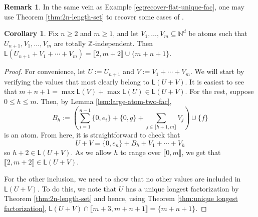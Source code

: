\documentclass{report}
\newcommand{\NN}{\mathbb{N}}
\newcommand{\ZZ}{\mathbb{Z}}
\newcommand{\llb}{\llbracket}
\newcommand{\rrb}{\rrbracket}
\renewcommand{\:}{\text{:}}
\theoremstyle{definition}
\newtheorem{cor}[defn]{Corollary}
\newtheorem{rk}[defn]{Remark}
\begin{document}
\begin{rk}
In the same vein as Example \ref{eg:recover-flat-unique-fac}, one may use Theorem \ref{thm:2n-length-set} to recover some cases of \cite[Proposition 4.8]{fan-tringali18}.
\end{rk}


\begin{cor} \label{thm:int-point-construction}
Fix $n\ge 2$ and $m\ge 1$, and let $V_1,\dots, V_m \subseteq \NN^d$ be atoms such that $U_{n+1},V_1,\dots, V_m$ are totally $\ZZ$-independent.
Then $\mathsf{L}(U_{n+1}+V_1+\cdots+V_m) = \llb 2,m+2 \rrb \cup \{m+n+1\}$.
\end{cor}

\begin{proof}
For convenience, let $U := U_{n+1}$ and $V := V_1 + \cdots + V_m$.
We will start by verifying the values that most clearly belong to $\mathsf{L}(U+V)$.
It is easiest to see that $m+n+1 =\max\mathsf{L}(V)+\max\mathsf{L}(U) \in \mathsf{L}(U+V)$.
For the rest, suppose $0\le h \le m$.
Then, by Lemma \ref{lem:large-atom-two-fac}, 
\[B_h := \left( \sum_{i=1}^{n-1} \{0,e_i\} + \{0,g\} + \sum_{j\in \llb h+1,m \rrb} V_j \right) \cup \{f\} \]
is an atom.
From here, it is straightforward to check that
\[ U+ V = \{0,e_n\} + B_h + V_1 + \cdots + V_h \]
so $h+2 \in \mathsf{L}(U+V)$.
As we allow $h$ to range over $\llb 0,m \rrb$, we get that $\llb 2,m+2 \rrb \in \mathsf{L}(U+V)$.

For the other inclusion, we need to show that no other values are included in $\mathsf{L}(U+V)$.
To do this, we note that $U$ has a unique longest factorization by Theorem \ref{thm:2n-length-set} and hence, using Theorem \ref{thm:unique longest factorization}, $\mathsf{L}(U+V) \cap \llb m+3, m+n+1 \rrb = \{m+n+1\}$.
\end{proof}







\end{document}
